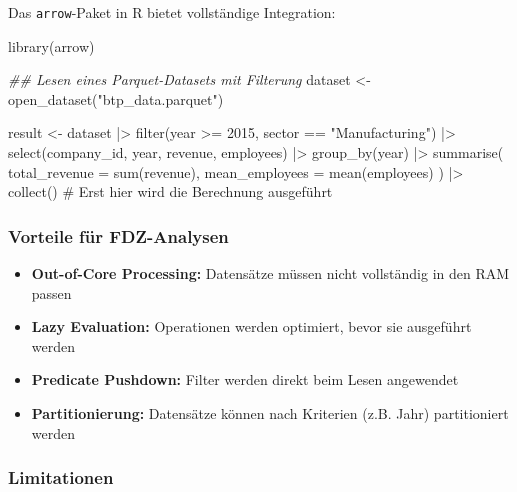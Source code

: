 \documentclass[
  ngerman,
  10pt,
  twocolumn]{article}
\newenvironment{Shaded}{\begin{snugshade}}{\end{snugshade}}
\newcommand{\AttributeTok}[1]{\textcolor[rgb]{0.40,0.45,0.13}{#1}}
\newcommand{\CommentTok}[1]{\textcolor[rgb]{0.37,0.37,0.37}{#1}}
\newcommand{\DecValTok}[1]{\textcolor[rgb]{0.68,0.00,0.00}{#1}}
\newcommand{\DocumentationTok}[1]{\textcolor[rgb]{0.37,0.37,0.37}{\textit{#1}}}
\newcommand{\FunctionTok}[1]{\textcolor[rgb]{0.28,0.35,0.67}{#1}}
\newcommand{\NormalTok}[1]{\textcolor[rgb]{0.00,0.23,0.31}{#1}}
\newcommand{\OtherTok}[1]{\textcolor[rgb]{0.00,0.23,0.31}{#1}}
\newcommand{\SpecialCharTok}[1]{\textcolor[rgb]{0.37,0.37,0.37}{#1}}
\newcommand{\StringTok}[1]{\textcolor[rgb]{0.13,0.47,0.30}{#1}}
\providecommand{\tightlist}{%
  \setlength{\itemsep}{0pt}\setlength{\parskip}{0pt}}
\begin{document}
Das \texttt{arrow}-Paket in R bietet vollständige Integration:

\begin{Shaded}
\begin{Highlighting}[]
\FunctionTok{library}\NormalTok{(arrow)}

\DocumentationTok{\#\# Lesen eines Parquet{-}Datasets mit Filterung}
\NormalTok{dataset }\OtherTok{\textless{}{-}} \FunctionTok{open\_dataset}\NormalTok{(}\StringTok{"btp\_data.parquet"}\NormalTok{)}

\NormalTok{result }\OtherTok{\textless{}{-}}\NormalTok{ dataset }\SpecialCharTok{|\textgreater{}}
  \FunctionTok{filter}\NormalTok{(year }\SpecialCharTok{\textgreater{}=} \DecValTok{2015}\NormalTok{, sector }\SpecialCharTok{==} \StringTok{"Manufacturing"}\NormalTok{) }\SpecialCharTok{|\textgreater{}}
  \FunctionTok{select}\NormalTok{(company\_id, year, revenue, employees) }\SpecialCharTok{|\textgreater{}}
  \FunctionTok{group\_by}\NormalTok{(year) }\SpecialCharTok{|\textgreater{}}
  \FunctionTok{summarise}\NormalTok{(}
    \AttributeTok{total\_revenue =} \FunctionTok{sum}\NormalTok{(revenue),}
    \AttributeTok{mean\_employees =} \FunctionTok{mean}\NormalTok{(employees)}
\NormalTok{  ) }\SpecialCharTok{|\textgreater{}}
  \FunctionTok{collect}\NormalTok{()  }\CommentTok{\# Erst hier wird die Berechnung ausgeführt}
\end{Highlighting}
\end{Shaded}

\subsubsection{Vorteile für
FDZ-Analysen}\label{vorteile-fuxfcr-fdz-analysen}

\begin{itemize}
\tightlist
\item
  \textbf{Out-of-Core Processing:} Datensätze müssen nicht vollständig
  in den RAM passen
\item
  \textbf{Lazy Evaluation:} Operationen werden optimiert, bevor sie
  ausgeführt werden
\item
  \textbf{Predicate Pushdown:} Filter werden direkt beim Lesen
  angewendet
\item
  \textbf{Partitionierung:} Datensätze können nach Kriterien (z.B. Jahr)
  partitioniert werden
\end{itemize}

\subsubsection{Limitationen}\label{limitationen}
\end{document}

